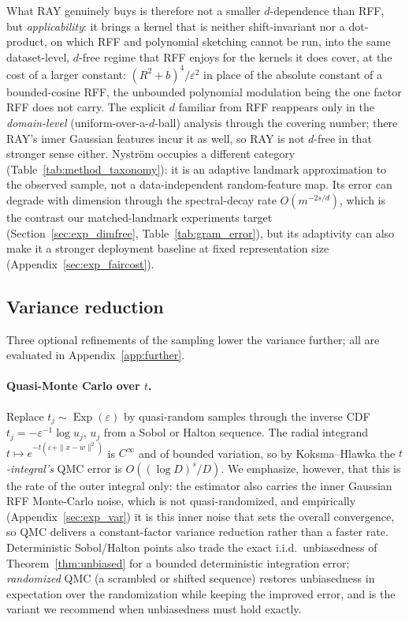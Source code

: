 \documentclass{article}
\DeclareMathOperator{\Exp}{Exp}
\begin{document}
What RAY genuinely buys is therefore not a smaller $d$-dependence than RFF, but \emph{applicability}: it brings a kernel that is neither shift-invariant nor a dot-product, on which RFF and polynomial sketching cannot be run, into the same dataset-level, $d$-free regime that RFF enjoys for the kernels it does cover, at the cost of a larger constant: $(R^2+b)^4/\varepsilon^2$ in place of the absolute constant of a bounded-cosine RFF, the unbounded polynomial modulation being the one factor RFF does not carry. The explicit $d$ familiar from RFF reappears only in the \emph{domain-level} (uniform-over-a-$d$-ball) analysis through the covering number; there RAY's inner Gaussian features incur it as well, so RAY is not $d$-free in that stronger sense either. Nystr\"om occupies a different category (Table~\ref{tab:method_taxonomy}): it is an adaptive landmark approximation to the observed sample, not a data-independent random-feature map. Its error can degrade with dimension through the spectral-decay rate $O(m^{-2s/d})$, which is the contrast our matched-landmark experiments target (Section~\ref{sec:exp_dimfree}, Table~\ref{tab:gram_error}), but its adaptivity can also make it a stronger deployment baseline at fixed representation size (Appendix~\ref{sec:exp_faircost}).

\subsection{Variance reduction}
\label{sec:variance_reduction}

Three optional refinements of the sampling lower the variance further; all are evaluated in Appendix~\ref{app:further}.

\paragraph{Quasi-Monte Carlo over $t$.} Replace $t_j\sim\Exp(\varepsilon)$ by quasi-random samples through the inverse CDF $t_j=-\varepsilon^{-1}\log u_j$, $u_j$ from a Sobol or Halton sequence. The radial integrand $t\mapsto e^{-t(\varepsilon+\|x-w\|^2)}$ is $C^\infty$ and of bounded variation, so by Koksma--Hlawka \citep{kuo2016application} the \emph{$t$-integral's} QMC error is $O((\log D)^s/D)$. We emphasize, however, that this is the rate of the outer integral only: the estimator also carries the inner Gaussian RFF Monte-Carlo noise, which is not quasi-randomized, and empirically (Appendix~\ref{sec:exp_var}) it is this inner noise that sets the overall convergence, so QMC delivers a constant-factor variance reduction rather than a faster rate. Deterministic Sobol/Halton points also trade the exact i.i.d.\ unbiasedness of Theorem~\ref{thm:unbiased} for a bounded deterministic integration error; \emph{randomized} QMC (a scrambled or shifted sequence) restores unbiasedness in expectation over the randomization while keeping the improved error, and is the variant we recommend when unbiasedness must hold exactly.
\end{document}
